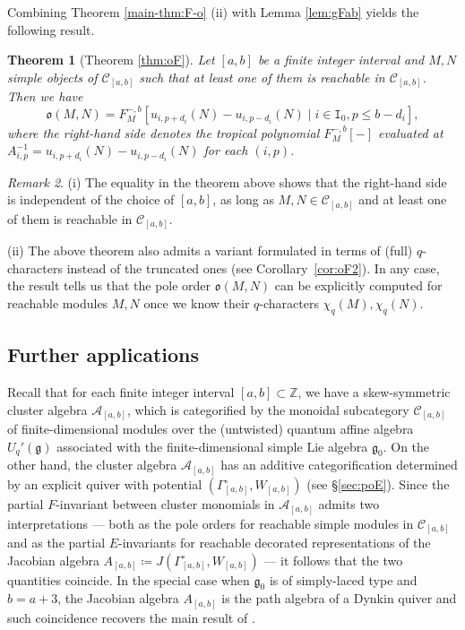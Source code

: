 \documentclass[12pt]{amsart}
\newtheorem{theorem}{Theorem}[section]
\theoremstyle{definition}
\theoremstyle{remark}
\newtheorem{remark}[theorem]{Remark}
\numberwithin{equation}{section}
\begin{document}
Combining  Theorem \ref{main-thm:F-o} (ii) with Lemma \ref{lem:gFab} yields the following result.
\begin{theorem}[Theorem \ref{thm:oF}]\label{main-thm:oF}
Let $[a,b]$ be a finite integer interval and $M,N$ simple objects of $\mathcal{C}_{[a,b]}$ such that at least one of them is reachable in $\mathcal{C}_{[a,b]}$. 
Then we have
\[ \mathfrak{o}(M,N) = F^{-, b}_{M}[u_{i,p+d_i}(N)-u_{i,p-d_i}(N) \mid  i \in \mathtt{I}_0, p \le b-d_i],\]
where the right-hand side denotes the tropical polynomial $F_M^{-, b}[-]$ evaluated at $A_{i,p}^{-1} = u_{i,p+d_i}(N)- u_{i,p-d_i}(N)$ for each $(i,p)$. 
\end{theorem}


\begin{remark}
(i) The equality in the theorem above shows that the right-hand side is independent of the choice of $[a,b]$, as long as $M,N\in \mathcal C_{[a,b]}$ and at least one of them is reachable in $\mathcal C_{[a,b]}$. 

(ii) The above theorem also admits a variant formulated in terms of (full) $q$-characters instead of the truncated ones (see Corollary~\ref{cor:oF2}). In any case, the result tells us that the pole order $\mathfrak{o}(M,N)$ can be explicitly computed for reachable modules $M, N$ once we know their $q$-characters $\chi_q(M), \chi_q(N)$.
\end{remark}

 

\subsection{Further applications}\label{intro:further}
Recall that for each finite integer interval $[a,b] \subset \mathbb{Z}$, we have a skew-symmetric cluster algebra $\mathcal{A}_{[a,b]}$, which is categorified by the monoidal subcategory $\mathcal{C}_{[a,b]}$ of finite-dimensional modules over the (untwisted) quantum affine algebra $U_q'(\mathfrak{g})$ associated with the finite-dimensional simple Lie algebra $\mathfrak{g}_0$. On the other hand, the cluster algebra $\mathcal{A}_{[a,b]}$ has an additive categorification determined by an explicit quiver with potential  $(\Gamma_{[a,b]}^\circ, W_{[a,b]})$ (see \S\ref{sec:poE}).
Since the partial $F$-invariant between cluster monomials in $\mathcal A_{[a,b]}$
admits two interpretations --- both as the pole orders for reachable simple modules in $\mathcal C_{[a,b]}$ and as the partial $E$-invariants for reachable decorated representations of the Jacobian algebra $A_{[a,b]}\coloneqq J(\Gamma_{[a,b]}^\circ, W_{[a,b]})$ --- it follows that the two quantities coincide. 
In the special case when $\mathfrak{g}_0$ is of simply-laced type and $b=a+3$, the Jacobian algebra $A_{[a,b]}$ is the path algebra of a Dynkin quiver and such coincidence recovers the main result of \cite{Fuj26}.
\end{document}

